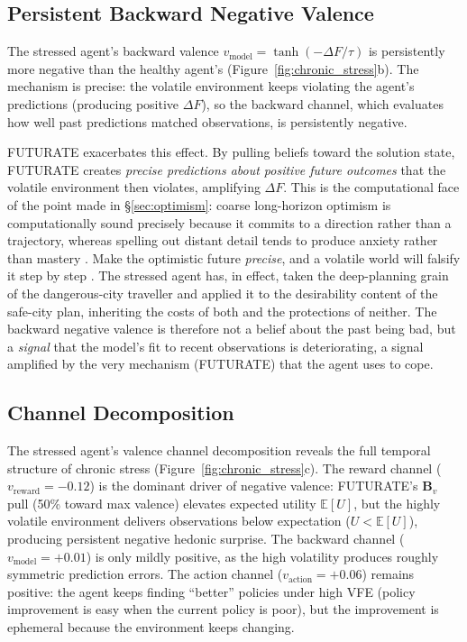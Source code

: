 \documentclass[11pt,a4paper]{article}
\newcommand{\rr}{\color{red!70!black}}
\begin{document}
\subsection{Persistent Backward Negative Valence}\label{sec:backward_negative}

The stressed agent's backward valence $v_{\text{model}} = \tanh(-\Delta F / \tau)$ is persistently more negative than the healthy agent's (Figure~\ref{fig:chronic_stress}b). The mechanism is precise: the volatile environment keeps violating the agent's predictions (producing positive $\Delta F$), so the backward channel, which evaluates how well past predictions matched observations, is persistently negative.

FUTURATE exacerbates this effect. By pulling beliefs toward the solution state, FUTURATE creates \emph{precise predictions about positive future outcomes} that the volatile environment then violates, amplifying $\Delta F$. {\rr This is the computational face of the point made in \S\ref{sec:optimism}: coarse long-horizon optimism is computationally sound precisely because it commits to a direction rather than a trajectory, whereas spelling out distant detail tends to produce anxiety rather than mastery \citep{sharot2011, fristonetal2021sophisticated}. Make the optimistic future \emph{precise}, and a volatile world will falsify it step by step \citep{tropeliberman2010}. The stressed agent has, in effect, taken the deep-planning grain of the dangerous-city traveller and applied it to the desirability content of the safe-city plan, inheriting the costs of both and the protections of neither.} The backward negative valence is therefore not a belief about the past being bad, but a \emph{signal} that the model's fit to recent observations is deteriorating, a signal amplified by the very mechanism (FUTURATE) that the agent uses to cope.

\subsection{Channel Decomposition}\label{sec:channel_decomp}

The stressed agent's valence channel decomposition reveals the full temporal structure of chronic stress (Figure~\ref{fig:chronic_stress}c). The reward channel ($v_{\text{reward}} = -0.12$) is the dominant driver of negative valence: FUTURATE's $\mathbf{B}_v$ pull (50\% toward max valence) elevates expected utility $\mathbb{E}[U]$, but the highly volatile environment delivers observations below expectation ($U < \mathbb{E}[U]$), producing persistent negative hedonic surprise. The backward channel ($v_{\text{model}} = +0.01$) is only mildly positive, as the high volatility produces roughly symmetric prediction errors. The action channel ($v_{\text{action}} = +0.06$) remains positive: the agent keeps finding ``better'' policies under high VFE (policy improvement is easy when the current policy is poor), but the improvement is ephemeral because the environment keeps changing.
\end{document}
